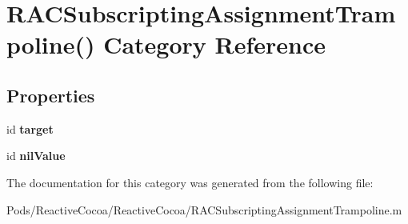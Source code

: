 \hypertarget{category_r_a_c_subscripting_assignment_trampoline_07_08}{}\section{R\+A\+C\+Subscripting\+Assignment\+Trampoline() Category Reference}
\label{category_r_a_c_subscripting_assignment_trampoline_07_08}
\subsection*{Properties}
\begin{DoxyCompactItemize}
\item 
\mbox{\label{category_r_a_c_subscripting_assignment_trampoline_07_08_a8997e4b4a2db279ef092ae86282d31d4}} 
id {\bfseries target}
\item 
\mbox{\label{category_r_a_c_subscripting_assignment_trampoline_07_08_a34ff3f27d39d41885aaebba90fd82c39}} 
id {\bfseries nil\+Value}
\end{DoxyCompactItemize}


The documentation for this category was generated from the following file\+:\begin{DoxyCompactItemize}
\item 
Pods/\+Reactive\+Cocoa/\+Reactive\+Cocoa/R\+A\+C\+Subscripting\+Assignment\+Trampoline.\+m\end{DoxyCompactItemize}
